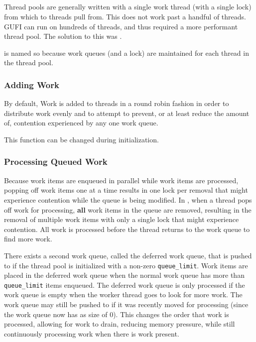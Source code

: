 \subsection{\qptp}
Thread pools are generally written with a single work thread (with a
single lock) from which to threads pull from. This does not work past
a handful of threads. GUFI can run on hundreds of threads, and thus
required a more performant thread pool. The solution to this was
\qptp.

\qptp is named so because work queues (and a lock) are maintained for
each thread in the thread pool.

\subsubsection{Adding Work}
By default, Work is added to threads in a round robin fashion in order
to distribute work evenly and to attempt to prevent, or at least
reduce the amount of, contention experienced by any one work queue.

This function can be changed during \qptp initialization.

\subsubsection{Processing Queued Work}
Because work items are enqueued in parallel while work items are
processed, popping off work items one at a time results in one lock
per removal that might experience contention while the queue is being
modified. In \qptp, when a thread pops off work for processing, {\bf
 all} work items in the queue are removed, resulting in the removal
of multiple work items with only a single lock that might experience
contention. All work is processed before the thread returns to the
work queue to find more work.

There exists a second work queue, called the deferred work queue, that
is pushed to if the thread pool is initialized with a non-zero
\texttt{queue\_limit}. Work items are placed in the deferred work
queue when the normal work queue has more than \texttt{queue\_limit}
items enqueued. The deferred work queue is only processed if the work
queue is empty when the worker thread goes to look for more work. The
work queue may still be pushed to if it was recently moved for
processing (since the work queue now has as size of 0). This changes
the order that work is processed, allowing for work to drain, reducing
memory pressure, while still continuously
processing work when there is work present.

